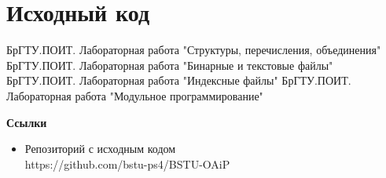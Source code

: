 \documentclass[12pt, a4paper]{article}
\begin{document}
\maketitle
\setcounter{page}{2}

\renewcommand{\contentsname}{Содержание}
\tableofcontents
\newpage




\newpage
\section{Исходный код}



\newpage
\begin{thebibliography}{3}
    \bibitem{}
    БрГТУ.ПОИТ. Лабораторная работа "Структуры, перечисления, объединения"
    \bibitem{}
    БрГТУ.ПОИТ. Лабораторная работа "Бинарные и текстовые файлы"
    \bibitem{}
    БрГТУ.ПОИТ. Лабораторная работа "Индексные файлы"
    \bibitem{}
    БрГТУ.ПОИТ. Лабораторная работа "Модульное программирование"
\end{thebibliography}

\textbf{Ссылки}
\begin{itemize}
    \item Репозиторий с исходным кодом\\
    https://github.com/bstu-ps4/BSTU-OAiP
\end{itemize}
\end{document}
